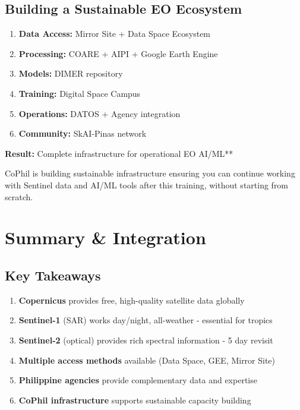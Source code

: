\documentclass[
  letterpaper,
  DIV=11,
  numbers=noendperiod]{scrartcl}
\providecommand{\tightlist}{%
  \setlength{\itemsep}{0pt}\setlength{\parskip}{0pt}}
\begin{document}
\subsection{Building a Sustainable EO
Ecosystem}\label{building-a-sustainable-eo-ecosystem}

\begin{enumerate}
\def\labelenumi{\arabic{enumi}.}
\tightlist
\item
  \textbf{Data Access:} Mirror Site + Data Space Ecosystem
\item
  \textbf{Processing:} COARE + AIPI + Google Earth Engine
\item
  \textbf{Models:} DIMER repository
\item
  \textbf{Training:} Digital Space Campus
\item
  \textbf{Operations:} DATOS + Agency integration
\item
  \textbf{Community:} SkAI-Pinas network
\end{enumerate}

\textbf{Result:} Complete infrastructure for operational EO AI/ML**

CoPhil is building sustainable infrastructure ensuring you can continue
working with Sentinel data and AI/ML tools after this training, without
starting from scratch.

\section{Summary \& Integration}\label{summary-integration}

\subsection{Key Takeaways}\label{key-takeaways}

\begin{enumerate}
\def\labelenumi{\arabic{enumi}.}
\tightlist
\item
  \textbf{Copernicus} provides free, high-quality satellite data
  globally
\item
  \textbf{Sentinel-1} (SAR) works day/night, all-weather - essential for
  tropics
\item
  \textbf{Sentinel-2} (optical) provides rich spectral information - 5
  day revisit
\item
  \textbf{Multiple access methods} available (Data Space, GEE, Mirror
  Site)
\item
  \textbf{Philippine agencies} provide complementary data and expertise
\item
  \textbf{CoPhil infrastructure} supports sustainable capacity building
\end{enumerate}
\end{document}
